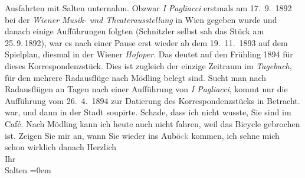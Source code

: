 \begin{ledgroupsized}[t]{13cm}
{{{                  Ausfahrten mit Salten unternahm. Obzwar \emph{I Pagliacci} erstmals am 17. 9. 1892 bei der \emph{Wiener Musik- und Theaterausstellung} in Wien gegeben wurde und danach einige Aufführungen folgten (Schnitzler selbst sah das Stück am 25. 9. 1892), war es nach einer Pause erst wieder
                  ab dem 19. 11. 1893 auf dem Spielplan, diesmal in der Wiener \emph{Hofoper}. Das
                  deutet auf den Frühling 1894 für dieses Korrespondenzstück. Dies ist
                  zugleich der einzige Zeitraum im \emph{Tagebuch}, für
                  den mehrere Radausflüge nach Mödling belegt
                  sind. Sucht man nach Radausflügen an Tagen nach einer Aufführung von \emph{I Pagliacci}, kommt nur die Aufführung vom
                     26. 4. 1894 zur Datierung des Korrespondenzstücks in
                  Betracht.}}}\label{K_L03120-1h} war, und dann in der Stadt soupirte. Schade, dass ich nicht wusste, Sie sind im Café.
               Nach Mödling kann ich heute auch
               nicht {\pb}fahren, weil das Bicycle
               gebrochen ist. Zeigen Sie mir an, wann Sie wieder ins Aubö\textcolor{gray}{ck} kommen, ich sehne mich schon wirklich danach\pend
           \pstart
           Herzlich {\\[\baselineskip]}Ihr {\\[\baselineskip]}\spacefill\mbox{Salten}\pend
           \leftskip=0em{}
         
         \endnumbering{}\end{ledgroupsized}  \newcommand{\dateiname}{L03120}\newcommand{\titel}{Felix Salten an Arthur Schnitzler, [27. 4. 1894?]}\newcommand{\editorInnen}{Martin Anton Müller und Laura Untner}
      